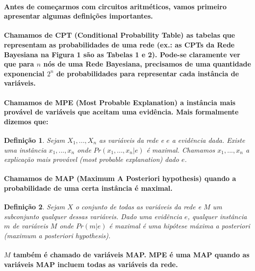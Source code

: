 \documentclass[a4paper,10pt]{article}
\theoremstyle{plain}
\newtheorem*{spn-def}{Definição}
\begin{document}
\paragraph{
  Antes de começarmos com circuitos aritméticos, vamos primeiro apresentar algumas definições
importantes.
}

\paragraph{
  Chamamos de CPT (Conditional Probability Table) as tabelas que representam as
probabilidades de uma rede (ex.: as CPTs da Rede Bayesiana na Figura 1 são as Tabelas 1 e 2).
Pode-se claramente ver que para $n$ nós de uma Rede Bayesiana, precisamos de uma quantidade
exponencial $2^n$ de probabilidades para representar cada instância de variáveis.
}

\paragraph{
  Chamamos de MPE (Most Probable Explanation) a instância mais provável de variáveis que aceitam
uma evidência. Mais formalmente dizemos que:
}

\begin{spn-def} Sejam $X_1,...,X_n$ as variáveis da rede e $e$ a evidência dada. Existe uma
  instância $x_1,...,x_n$ onde $Pr(x_1,...,x_n|e)$ é maximal. Chamamos $x_1,...,x_n$ a
  \textit{explicação mais provável} (\textit{most probable explanation}) dado $e$.
\end{spn-def}

\paragraph{
  Chamamos de MAP (Maximum A Posteriori hypothesis) quando a probabilidade de uma certa instância
é maximal.
}

\begin{spn-def} Sejam $X$ o conjunto de todas as variáveis da rede e $M$ um subconjunto qualquer
  dessas variáveis. Dado uma evidência $e$, qualquer instância $m$ de variáveis $M$ onde $Pr(m|e)$
  é maximal é uma \textit{hipótese máxima a posteriori} (\textit{maximum a posteriori hypothesis}).
\end{spn-def}

\paragraph{
  $M$ também é chamado de variáveis MAP. MPE é uma MAP quando as variáveis MAP incluem todas as
variáveis da rede.
}
\end{document}
